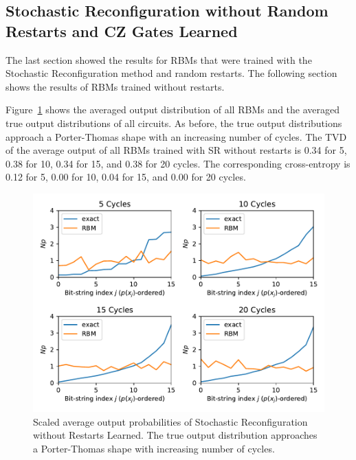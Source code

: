 \newpage

\subsection{Stochastic Reconfiguration without Random Restarts and CZ Gates Learned}

The last section showed the results for RBMs that were trained with the Stochastic Reconfiguration
method and random restarts. The following section shows the results of RBMs trained without restarts.

Figure~\ref{fig:sr_no_restarts_avgPDF} shows the averaged output distribution of all RBMs and
the averaged true output distributions of all circuits. As before, the 
true output distributions approach a Porter-Thomas shape with an increasing number of cycles.
The TVD of the average output of all RBMs trained with SR without restarts
is 0.34 for 5, 0.38 for 10, 0.34 for 15, and 0.38 for 20 cycles. The corresponding cross-entropy is 
0.12 for 5, 0.00 for 10, 0.04 for 15, and 0.00 for 20 cycles.

\begin{figure}[H]
  \centering
  \includegraphics[width=\textwidth]{figures/results/SR-no-restarts-learned/avgPDF.pdf}
  \caption[Scaled average output probabilities of Stochastic Reconfiguration without Restarts Learned]{
    Scaled average output probabilities of Stochastic Reconfiguration without Restarts Learned. The true 
    output distribution approaches a Porter-Thomas shape with increasing number of cycles.}
  \label{fig:sr_no_restarts_avgPDF}
\end{figure}

